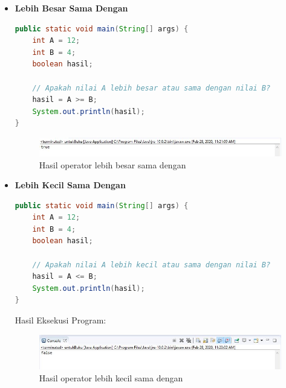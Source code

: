 \begin{enumerate}
\begin{itemize}
            \item \textbf{Lebih Besar Sama Dengan}
            \begin{lstlisting}[language=Java]
public static void main(String[] args) {
    int A = 12;
    int B = 4;
    boolean hasil;
            
    // Apakah nilai A lebih besar atau sama dengan nilai B?
    hasil = A >= B;
    System.out.println(hasil);
}
            \end{lstlisting}
            \begin{figure}[htbp!]
                \centering
                \includegraphics[scale=0.6]{pictures/operator_perbandingan_lebih_besar_sama_dengan.JPG}
                \caption{Hasil operator lebih besar sama dengan}
                \label{}
            \end{figure}

            \item \textbf{Lebih Kecil Sama Dengan}
            \begin{lstlisting}[language=Java]
public static void main(String[] args) {
    int A = 12;
    int B = 4;
    boolean hasil;
            
    // Apakah nilai A lebih kecil atau sama dengan nilai B?
    hasil = A <= B;
    System.out.println(hasil);
}
            \end{lstlisting}
            Hasil Eksekusi Program:
            \begin{figure}[htbp!]
                \centering
                \includegraphics[scale=0.6]{pictures/operator_perbandingan_lebih_kecil_sama_dengan.JPG}
                \caption{Hasil operator lebih kecil sama dengan}
                \label{}
            \end{figure}

        \end{itemize}



\end{enumerate}
